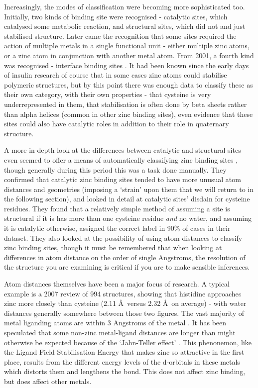 Increasingly, the modes of classification were becoming more sophisticated too. Initially, two kinds of binding site were recognised - catalytic sites, which catalysed some metabolic reaction, and structural sites, which did not and just stabilised structure. Later came the recognition that some sites required the action of multiple metals in a single functional unit - either multiple zinc atoms, or a zinc atom in conjunction with another metal atom. From 2001, a fourth kind was recognised - interface binding sites \cite{auld2001zinc}. It had been known since the early days of insulin research of course that in some cases zinc atoms could stabilise polymeric structures, but by this point there was enough data to classify these as their own category, with their own properties - that cysteine is very underrepresented in them, that stabilisation is often done by beta sheets rather than alpha helices (common in other zinc binding sites), even evidence that these sites could also have catalytic roles in addition to their role in quaternary structure.

A more in-depth look at the differences between catalytic and structural sites even seemed to offer a means of automatically classifying zinc binding sites \cite{lee2008physical}, though generally during this period this was a task done manually. They confirmed that catalytic zinc binding sites tended to have more unusual atom distances and geometries (imposing a `strain' upon them that we will return to in the following section), and looked in detail at catalytic sites' disdain for cysteine residues. They found that a relatively simple method of assuming a site is structural if it is has more than one cysteine residue \textit{and} no water, and assuming it is catalytic otherwise, assigned the correct label in 90\% of cases in their dataset. They also looked at the possibility of using atom distances to classify zinc binding sites, though it must be remembered that when looking at differences in atom distance on the order of single Angstroms, the resolution of the structure you are examining is critical if you are to make sensible inferences.

Atom distances themselves have been a major focus of research. A typical example is a 2007 review \cite{tamames2007analysis} of 994 structures, showing that histidine approaches zinc more closely than cysteine (2.11 \AA \ versus 2.32 \AA \ on average) - with water distances generally somewhere between those two figures. The vast majority of metal liganding atoms are within 3 Angstroms of the metal \cite{dokmanic2008metals}. It has been speculated that some non-zinc metal-ligand distances are longer than might otherwise be expected because of the `Jahn-Teller effect' \cite{doi:10.1002/prot.21601}. This phenonemon, like the Ligand Field Stabilisation Energy that makes zinc so attractive in the first place, results from the different energy levels of the d-orbitals in these metals which distorts them and lengthens the bond. This does not affect zinc binding, but does affect other metals.

